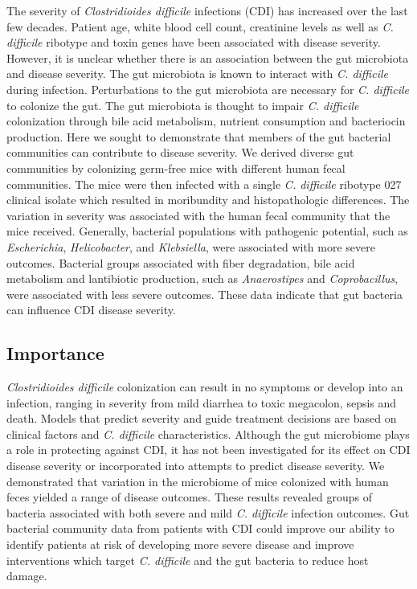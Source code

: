 \documentclass[
  12pt,
]{article}
\begin{document}
The severity of \emph{Clostridioides difficile} infections (CDI) has
increased over the last few decades. Patient age, white blood cell
count, creatinine levels as well as \emph{C. difficile} ribotype and
toxin genes have been associated with disease severity. However, it is
unclear whether there is an association between the gut microbiota and
disease severity. The gut microbiota is known to interact with \emph{C.
difficile} during infection. Perturbations to the gut microbiota are
necessary for \emph{C. difficile} to colonize the gut. The gut
microbiota is thought to impair \emph{C. difficile} colonization through
bile acid metabolism, nutrient consumption and bacteriocin production.
Here we sought to demonstrate that members of the gut bacterial
communities can contribute to disease severity. We derived diverse gut
communities by colonizing germ-free mice with different human fecal
communities. The mice were then infected with a single \emph{C.
difficile} ribotype 027 clinical isolate which resulted in moribundity
and histopathologic differences. The variation in severity was
associated with the human fecal community that the mice received.
Generally, bacterial populations with pathogenic potential, such as
\emph{Escherichia}, \emph{Helicobacter}, and \emph{Klebsiella}, were
associated with more severe outcomes. Bacterial groups associated with
fiber degradation, bile acid metabolism and lantibiotic production, such
as \emph{Anaerostipes} and \emph{Coprobacillus}, were associated with
less severe outcomes. These data indicate that gut bacteria can
influence CDI disease severity.

\hypertarget{importance}{%
\subsection{Importance}\label{importance}}

\emph{Clostridioides difficile} colonization can result in no symptoms
or develop into an infection, ranging in severity from mild diarrhea to
toxic megacolon, sepsis and death. Models that predict severity and
guide treatment decisions are based on clinical factors and \emph{C.
difficile} characteristics. Although the gut microbiome plays a role in
protecting against CDI, it has not been investigated for its effect on
CDI disease severity or incorporated into attempts to predict disease
severity. We demonstrated that variation in the microbiome of mice
colonized with human feces yielded a range of disease outcomes. These
results revealed groups of bacteria associated with both severe and mild
\emph{C. difficile} infection outcomes. Gut bacterial community data
from patients with CDI could improve our ability to identify patients at
risk of developing more severe disease and improve interventions which
target \emph{C. difficile} and the gut bacteria to reduce host damage.
\end{document}

